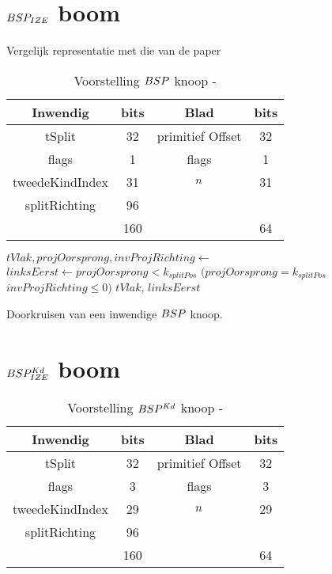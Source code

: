 \section{$BSP_{IZE}$ boom}
\label{sec:h4-bspize}
Vergelijk representatie met die van de paper
\begin{table}
        \centering
        \begin{tabular}{@{}|c|c|c|c|@{}} \toprule      
            Inwendig & bits & Blad & bits \\ \midrule
            tSplit & 32 & primitief Offset & 32 \\
            flags  & 1  &  flags   & 1    \\
            tweedeKindIndex & 31 & $n$ & 31 \\
            splitRichting & 96 &  &  \\ \hline \hline
            & 160 & & 64    \\ \bottomrule
        \end{tabular}
    \caption[Voorstelling $\symBSP$ knoop]{Voorstelling $\symBSP$ knoop - \small }
    \label{tab:voorstelling-bsp-knoop}
\end{table}   

  
\begin{dutchalgorithm}
    \begin{algorithmic}       
            \State $tVlak, projOorsprong, invProjRichting \gets $ 
            \State $linksEerst \gets projOorsprong < k_{splitPos}$ \Or $(projOorsprong = k_{splitPos}$ \And $invProjRichting \leq 0)$
            \State \Return $tVlak$, $linksEerst$
        \EndFunction
    \end{algorithmic}
    \caption{Doorkruisen van een inwendige $\symBSP$ knoop.}
\end{dutchalgorithm}

\section{$BSP^{Kd}_{IZE}$ boom}
\label{sec:h4-bspizefastkd}
\begin{table}
        \centering
        \begin{tabular}{@{}|c|c|c|c|@{}} \toprule      
            Inwendig & bits & Blad & bits \\ \midrule
            tSplit & 32 & primitief Offset & 32 \\
            flags  & 3  &  flags   & 3   \\
            tweedeKindIndex & 29 & $n$ & 29 \\
            splitRichting & 96 &  &  \\ \hline \hline
            & 160 & & 64    \\ \bottomrule
        \end{tabular}
    \caption[Voorstelling $\symBSPKd$ knoop]{Voorstelling $\symBSPKd$ knoop - \small }
    \label{tab:voorstelling-bspkd-knoop}
\end{table}   


